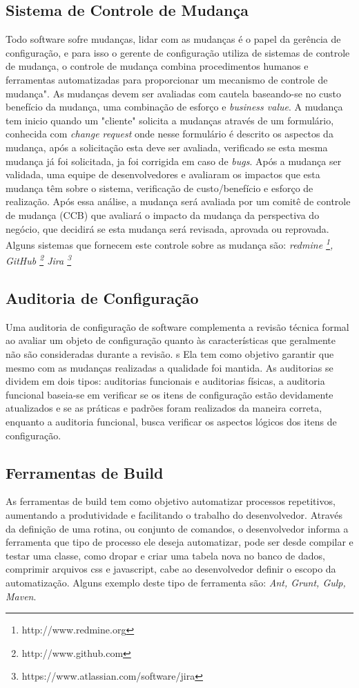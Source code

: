 \subsection{Sistema de Controle de Mudança}
Todo software sofre mudanças, lidar com as mudanças é o papel da gerência de configuração, e para isso o gerente de configuração utiliza de sistemas de controle de mudança, o controle de mudança combina procedimentos humanos e ferramentas automatizadas para proporcionar um mecanismo de controle de mudança".  As mudanças devem ser avaliadas com cautela baseando-se no custo benefício da mudança, uma combinação de esforço e \textit{business value}. A mudança tem inicio quando um "cliente" solicita a mudanças através de um formulário, conhecida com \textit{change request} onde nesse formulário é descrito os aspectos da mudança, após a solicitação esta deve ser avaliada, verificado se esta mesma mudança já foi solicitada, ja foi corrigida em caso de \textit{bugs}. Após a mudança ser validada, uma equipe de desenvolvedores e avaliaram os impactos que esta mudança têm sobre o sistema, verificação de custo/benefício e esforço de realização. \cite{sommerville2011} Após essa análise, a mudança será avaliada por um comitê de controle de mudança (CCB) que avaliará o impacto da mudança da perspectiva do negócio, que decidirá se esta mudança será revisada, aprovada ou reprovada. Alguns sistemas que fornecem este controle sobre as mudança são: \textit{redmine \footnote{http://www.redmine.org}, GitHub \footnote{http://www.github.com} Jira \footnote{https://www.atlassian.com/software/jira}}
\subsection{Auditoria de Configuração}
	Uma auditoria de configuração de software complementa a revisão técnica formal ao avaliar um objeto de configuração quanto às características que geralmente não são consideradas durante a revisão. s Ela tem como objetivo garantir que mesmo com as mudanças realizadas a qualidade foi mantida. As auditorias se dividem em dois tipos: auditorias funcionais e auditorias físicas, a auditoria funcional baseia-se em verificar se os itens de configuração estão devidamente atualizados e se as práticas e padrões foram realizados da maneira correta, enquanto a auditoria funcional, busca verificar os aspectos lógicos dos itens de configuração.
\subsection{Ferramentas de Build}
As ferramentas de build tem como objetivo automatizar processos repetitivos, aumentando a produtividade e facilitando o trabalho do desenvolvedor. Através da definição de uma rotina, ou conjunto de comandos, o desenvolvedor informa a ferramenta que tipo de processo ele deseja automatizar, pode ser desde compilar e testar uma classe, como dropar e criar uma tabela nova no banco de dados, comprimir arquivos css e javascript, cabe ao desenvolvedor definir o escopo da automatização. Alguns exemplo deste tipo de ferramenta são: \textit{Ant, Grunt, Gulp, Maven}.


